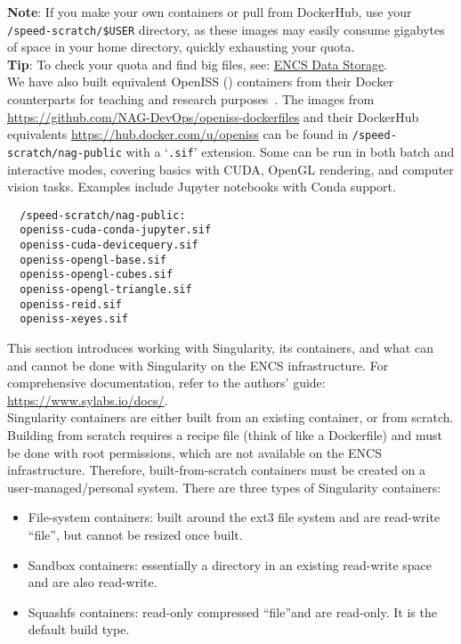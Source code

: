 \noindent \textbf{Note}: If you make your own containers or pull from DockerHub,
use your \verb+/speed-scratch/$USER+ directory, as these images may easily 
consume gigabytes of space in your home directory, quickly exhausting your quota.\\

\noindent \textbf{Tip}: To check your quota and find big files, 
see: \href{https://www.concordia.ca/ginacody/aits/encs-data-storage.html}{ENCS Data Storage}.\\

We have also built equivalent OpenISS () containers from their Docker 
counterparts for teaching and research purposes~\cite{oi-containers-poster-siggraph2023}. 
The images from \url{https://github.com/NAG-DevOps/openiss-dockerfiles}
and their DockerHub equivalents \url{https://hub.docker.com/u/openiss} can be found in 
\verb+/speed-scratch/nag-public+ with a `\texttt{.sif}' extension.
Some can be run in both batch and interactive modes, covering basics with CUDA, OpenGL rendering, 
and computer vision tasks. Examples include Jupyter notebooks with Conda support.

\begin{verbatim}
  /speed-scratch/nag-public:
  openiss-cuda-conda-jupyter.sif
  openiss-cuda-devicequery.sif
  openiss-opengl-base.sif
  openiss-opengl-cubes.sif
  openiss-opengl-triangle.sif
  openiss-reid.sif
  openiss-xeyes.sif
\end{verbatim}

This section introduces working with Singularity, its containers, and what can and cannot 
be done with Singularity on the ENCS infrastructure. For comprehensive documentation, 
refer to the authors' guide: \url{https://www.sylabs.io/docs/}.\\


Singularity containers are either built from an existing container, or from scratch. 
Building from scratch requires a recipe file (think of like a Dockerfile) and
must be done with root permissions, which are not available on the ENCS infrastructure. 
Therefore, built-from-scratch containers must be created on a user-managed/personal system. 
There are three types of Singularity containers:

\begin{itemize}
  \item File-system containers: built around the ext3 file system and are read-write ``file'', but cannot be resized once built.
  \item Sandbox containers: essentially a directory in an existing read-write space and are also read-write.
  \item Squashfs containers: read-only compressed ``file''and are read-only. It is the default build type.
\end{itemize}

